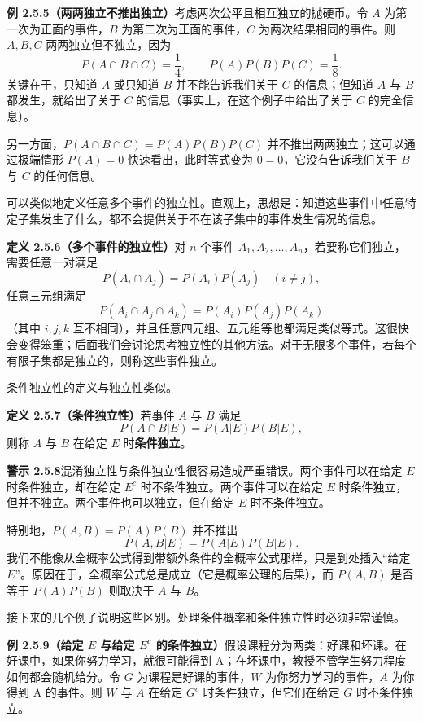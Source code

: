 \documentclass[UTF8,12pt,a4paper,fontset=fandol]{ctexart}
\begin{document}
\noindent\textbf{例 2.5.5（两两独立不推出独立）}\quad 考虑两次公平且相互独立的抛硬币。令 $A$ 为第一次为正面的事件，$B$ 为第二次为正面的事件，$C$ 为两次结果相同的事件。则 $A,B,C$ 两两独立但不独立，因为
\[
  P(A\cap B\cap C)=\frac14,\qquad P(A)P(B)P(C)=\frac18.
\]
关键在于，只知道 $A$ 或只知道 $B$ 并不能告诉我们关于 $C$ 的信息；但知道 $A$ 与 $B$ 都发生，就给出了关于 $C$ 的信息（事实上，在这个例子中给出了关于 $C$ 的完全信息）。

另一方面，$P(A\cap B\cap C)=P(A)P(B)P(C)$ 并不推出两两独立；这可以通过极端情形 $P(A)=0$ 快速看出，此时等式变为 $0=0$，它没有告诉我们关于 $B$ 与 $C$ 的任何信息。

可以类似地定义任意多个事件的独立性。直观上，思想是：知道这些事件中任意特定子集发生了什么，都不会提供关于不在该子集中的事件发生情况的信息。

\noindent\textbf{定义 2.5.6（多个事件的独立性）}\quad 对 $n$ 个事件 $A_1,A_2,\ldots,A_n$，若要称它们独立，需要任意一对满足
\[
  P(A_i\cap A_j)=P(A_i)P(A_j)\quad (i\ne j),
\]
任意三元组满足
\[
  P(A_i\cap A_j\cap A_k)=P(A_i)P(A_j)P(A_k)
\]
（其中 $i,j,k$ 互不相同），并且任意四元组、五元组等也都满足类似等式。这很快会变得笨重；后面我们会讨论思考独立性的其他方法。对于无限多个事件，若每个有限子集都是独立的，则称这些事件独立。

条件独立性的定义与独立性类似。

\noindent\textbf{定义 2.5.7（条件独立性）}\quad 若事件 $A$ 与 $B$ 满足
\[
  P(A\cap B|E)=P(A|E)P(B|E),
\]
则称 $A$ 与 $B$ 在给定 $E$ 时\textbf{条件独立}。

\noindent\textbf{警示 2.5.8}\quad 混淆独立性与条件独立性很容易造成严重错误。两个事件可以在给定 $E$ 时条件独立，却在给定 $E^c$ 时不条件独立。两个事件可以在给定 $E$ 时条件独立，但并不独立。两个事件也可以独立，但在给定 $E$ 时不条件独立。

特别地，$P(A,B)=P(A)P(B)$ 并不推出
\[
  P(A,B|E)=P(A|E)P(B|E).
\]
我们不能像从全概率公式得到带额外条件的全概率公式那样，只是到处插入“给定 $E$”。原因在于，全概率公式总是成立（它是概率公理的后果），而 $P(A,B)$ 是否等于 $P(A)P(B)$ 则取决于 $A$ 与 $B$。

接下来的几个例子说明这些区别。处理条件概率和条件独立性时必须非常谨慎。

\noindent\textbf{例 2.5.9（给定 $E$ 与给定 $E^c$ 的条件独立）}\quad 假设课程分为两类：好课和坏课。在好课中，如果你努力学习，就很可能得到 A；在坏课中，教授不管学生努力程度如何都会随机给分。令 $G$ 为课程是好课的事件，$W$ 为你努力学习的事件，$A$ 为你得到 A 的事件。则 $W$ 与 $A$ 在给定 $G^c$ 时条件独立，但它们在给定 $G$ 时不条件独立。
\end{document}
